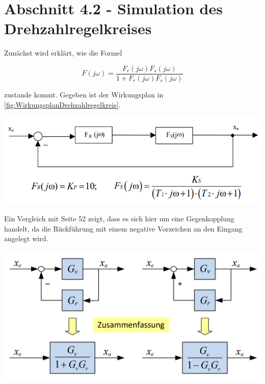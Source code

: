 \documentclass[            %
draft = false,             		%
paper = A4,                		%
pagesize = pdftex,         		%
fontsize = 10pt,           		%
DIV=15,                    		%
twoside = false,           		%
twocolumn = false,         		%
parskip = full,           		%
chapterprefix = false,      		%
appendixprefix = true,     		%
headinclude = false,       		%
footinclude = false,       		%
mpinclude = false,         		%
numbers = auto,            		%
cleardoublepage = plain,   		%
footnotes = multiple,      		%
titlepage = true,          		%
headings = normal,         		%
open = right,              		%
bibliography = openstyle,  		%
listof = chaptergapline,   		%
overfullrule = true,
]{scrbook}
\begin{document}
\newpage
{\let\clearpage\relax \chapter{Abschnitt 4.2 - Simulation des Drehzahlregelkreises}} \label{chpt:SimulationRevolutionControlLoop}

Zunächst wird erklärt, wie die Formel

\begin{equation}
F(j\omega) = \frac{F_r(j\omega)F_s(j\omega)}{1 + F_r(j\omega)F_s(j\omega)}
\end{equation}

zustande kommt. Gegeben ist der Wirkungsplan in \ref{fig:WirkungsplanDrehzahlregelkreis}.

\begin{center}
   \begin{minipage}[b]{0.6\textwidth}
      \includegraphics[scale=0.7]{Bilder/WirkungsplanDrehzahlregelkreis.PNG}
      \label{fig:WirkungsplanDrehzahlregelkreis} 
   \end{minipage}
\end{center}

Ein Vergleich mit \cite{Skript_Regelungstechnik} Seite 52 zeigt, dass es sich hier um eine Gegenkopplung handelt, da die Rückführung mit einem negative Vorzeichen an 
den Eingang angelegt wird. 

\begin{center}
   \begin{minipage}[b]{0.9\textwidth}
      \includegraphics[scale=0.7]{Bilder/GegenUndMitkopplung.PNG}
      \label{fig:GegenUndMitkopplung} 
   \end{minipage}
\end{center}
\end{document}
